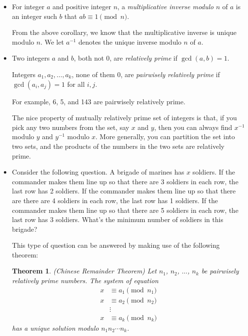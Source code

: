 \documentclass{article}
\newtheorem{theorem}[lemma]{Theorem}
\newtheorem{collorary}[lemma]{Collorary}
\begin{document}
\begin{itemize}
\begin{collorary}
If $\gcd(a,n) = 1$, then the equation $ax \equiv 1 \pmod n$ has a unique solution modulo $n$. (In other words, there exists one and only one $x$ such that $0 \leq x < n$ and $x$ satisfies the equation.)
\end{collorary}

\item For integer $a$ and positive integer $n$, a \emph{multiplicative inverse modulo $n$} of $a$ is an integer such $b$ that $ab \equiv 1 \pmod n$.

From the above corollary, we know that the multiplicative inverse is unique modulo $n$. We let $a^{-1}$ denotes the unique inverse modulo $n$ of $a$.

\item Two integers $a$ and $b$, both not 0, are \emph{relatively prime} if $\gcd(a,b) = 1$. 

Integers $a_1, a_2, \dotsc, a_k$, none of them 0, are \emph{pairwisely relatively prime} if $\gcd(a_i, a_j) = 1$ for all $i,j$.

For example, 6, 5, and 143 are pairwisely relatively prime.

The nice property of mutually relatively prime set of integers is that, if you pick any two numbers from the set, say $x$ and $y$, then you can always find $x^{-1}$ modulo $y$ and $y^{-1}$ modulo $x$. More generally, you can partition the set into two sets, and the products of the numbers in the two sets are relatively prime.

\item Consider the following question. A brigade of marines has $x$ soldiers. If the commander makes them line up so that there are 3 soldiers in each row, the last row has 2 soldiers. If the commander makes them line up so that there are there are 4 soldiers in each row, the last row has 1 soldiers. If the commander makes them line up so that there are 5 soldiers in each row, the last row has 3 soldiers. What's the minimum number of soldiers in this brigade?

This type of question can be answered by making use of the following theorem:

\begin{theorem}(Chinese Remainder Theorem)
Let $n_1$, $n_2$, $\dotsc$, $n_k$ be pairwisely relatively prime numbers. The system of equation
\begin{align*}
x & \equiv a_1 \pmod{n_1}\\
x & \equiv a_2 \pmod{n_2}\\
& \vdots \\
x & \equiv a_k \pmod{n_k}
\end{align*}
has a unique solution modulo $n_1 n_2 \dotsm n_k$.
\end{theorem}


\end{itemize}
\end{document}
